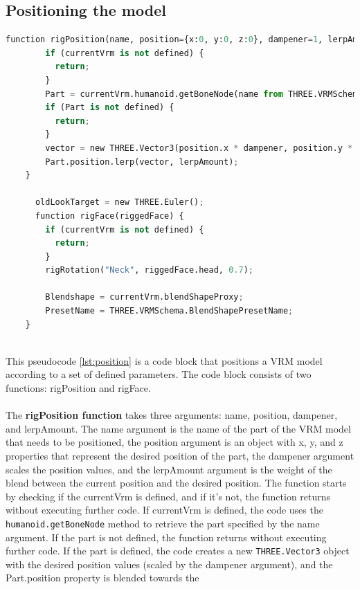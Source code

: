 \subsection{Positioning the model}

\begin{lstlisting}[language=Python,caption=Position of the model,label=lst:position]
    function rigPosition(name, position={x:0, y:0, z:0}, dampener=1, lerpAmount=0.3) {
        if (currentVrm is not defined) {
          return;
        }
        Part = currentVrm.humanoid.getBoneNode(name from THREE.VRMSchema.HumanoidBoneName);
        if (Part is not defined) {
          return;
        }
        vector = new THREE.Vector3(position.x * dampener, position.y * dampener, position.z * dampener);
        Part.position.lerp(vector, lerpAmount);
    }
      
      oldLookTarget = new THREE.Euler();
      function rigFace(riggedFace) {
        if (currentVrm is not defined) {
          return;
        }
        rigRotation("Neck", riggedFace.head, 0.7);
      
        Blendshape = currentVrm.blendShapeProxy;
        PresetName = THREE.VRMSchema.BlendShapePresetName;
    }
      

\end{lstlisting}
This pseudocode \ref{lst:position} is a code block that positions a VRM model according to a set of defined parameters. 
The code block consists of two functions: rigPosition and rigFace.
\\
\\
The \textbf{rigPosition function} takes three arguments: name, position, dampener, and lerpAmount. The name argument is the name 
of the part of the VRM model that needs to be positioned, the position argument is an object with x, y, and z properties 
that represent the desired position of the part, the dampener argument scales the position values, and the lerpAmount 
argument is the weight of the blend between the current position and the desired position.
The function starts by checking if the currentVrm is defined, and if it's not, the function returns without executing further code. 
If currentVrm is defined, the code uses the \texttt{humanoid.getBoneNode} method to retrieve the part specified by the name argument. 
If the part is not defined, the function returns without executing further code.
If the part is defined, the code creates a new \texttt{THREE.Vector3} object with the desired position 
values (scaled by the dampener argument), and the Part.position property is blended towards the 
